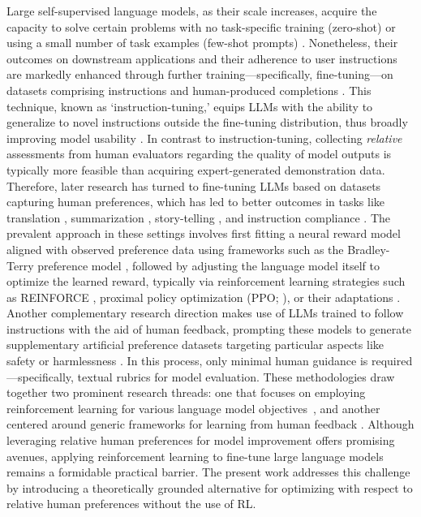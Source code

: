 Large self-supervised language models, as their scale increases, acquire the capacity to solve certain problems with no task-specific training (zero-shot) \citep{radford2019language} or using a small number of task examples (few-shot prompts) \citep{gpt3,megatron,chowdhery2022palm}. Nonetheless, their outcomes on downstream applications and their adherence to user instructions are markedly enhanced through further training—specifically, fine-tuning—on datasets comprising instructions and human-produced completions \citep{mishra-etal-2022-cross,sanh2022multitask,chung2022scaling,thoppilan2022lamda}. This technique, known as `instruction-tuning,' equips LLMs with the ability to generalize to novel instructions outside the fine-tuning distribution, thus broadly improving model usability \citep{chung2022scaling}. In contrast to instruction-tuning, collecting \textit{relative} assessments from human evaluators regarding the quality of model outputs is typically more feasible than acquiring expert-generated demonstration data. Therefore, later research has turned to fine-tuning LLMs based on datasets capturing human preferences, which has led to better outcomes in tasks like translation \citep{kreutzer-etal-2018-reliability}, summarization \citep{stiennon2022learning,ziegler2020finetuning}, story-telling \citep{ziegler2020finetuning}, and instruction compliance \citep{ouyang2022training,ramamurthy2023is}. The prevalent approach in these settings involves first fitting a neural reward model aligned with observed preference data using frameworks such as the Bradley-Terry preference model \citep{bradley1952rankanalysis}, followed by adjusting the language model itself to optimize the learned reward, typically via reinforcement learning strategies such as REINFORCE \citep{williams1992reinforce}, proximal policy optimization (PPO; \cite{schulman2017proximal}), or their adaptations \citep{ramamurthy2023is}. Another complementary research direction makes use of LLMs trained to follow instructions with the aid of human feedback, prompting these models to generate supplementary artificial preference datasets targeting particular aspects like safety or harmlessness \citep{bai2022constitutional}. In this process, only minimal human guidance is required—specifically, textual rubrics for model evaluation. These methodologies draw together two prominent research threads: one that focuses on employing reinforcement learning for various language model objectives~\citep{Ranzato2015SequenceLT,paulus2018a,wu2018learning}, and another centered around generic frameworks for learning from human feedback \citep{christiano2017deep,kupcsik2018learning}. Although leveraging relative human preferences for model improvement offers promising avenues, applying reinforcement learning to fine-tune large language models remains a formidable practical barrier. The present work addresses this challenge by introducing a theoretically grounded alternative for optimizing with respect to relative human preferences without the use of RL.

